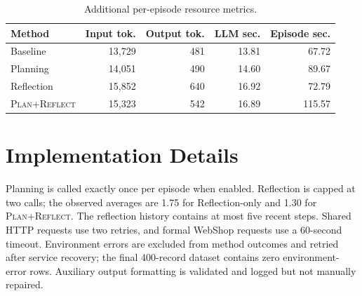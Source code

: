 \documentclass{article}
\newcommand{\method}[1]{\textsc{#1}}
\newcommand{\ours}{\method{Plan+Reflect}\xspace}
\begin{document}
\begin{table}[h]
\centering
\caption{Additional per-episode resource metrics.}
\label{tab:resources}
\small
\begin{tabular}{lrrrr}
\toprule
Method & Input tok. & Output tok. & LLM sec. & Episode sec. \\
\midrule
Baseline & 13,729 & 481 & 13.81 & 67.72 \\
Planning & 14,051 & 490 & 14.60 & 89.67 \\
Reflection & 15,852 & 640 & 16.92 & 72.79 \\
\ours & 15,323 & 542 & 16.89 & 115.57 \\
\bottomrule
\end{tabular}
\end{table}

\section{Implementation Details}

Planning is called exactly once per episode when enabled. Reflection is capped at two calls; the observed averages are 1.75 for Reflection-only and 1.30 for \ours. The reflection history contains at most five recent steps. Shared HTTP requests use two retries, and formal WebShop requests use a 60-second timeout. Environment errors are excluded from method outcomes and retried after service recovery; the final 400-record dataset contains zero environment-error rows. Auxiliary output formatting is validated and logged but not manually repaired.
\end{document}

